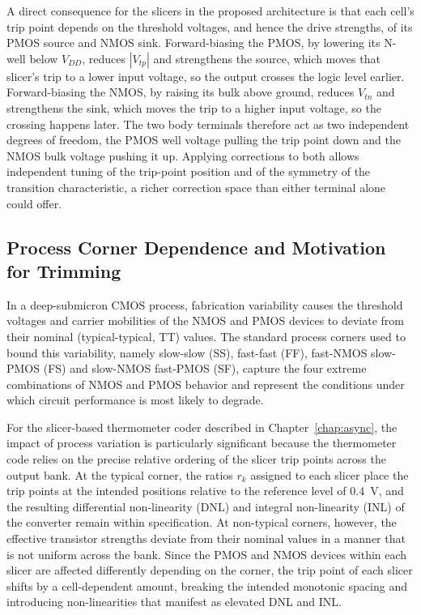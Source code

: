 A direct consequence for the slicers in the proposed architecture is that
each cell's trip point depends on the threshold voltages, and hence the drive
strengths, of its PMOS source and NMOS sink. Forward-biasing the PMOS, by
lowering its N-well below $V_{DD}$, reduces $|V_{tp}|$ and strengthens the
source, which moves that slicer's trip to a lower input voltage, so the output
crosses the logic level earlier. Forward-biasing the NMOS, by raising its bulk
above ground, reduces $V_{tn}$ and strengthens the sink, which moves the trip
to a higher input voltage, so the crossing happens later. The two body
terminals therefore act as two independent degrees of freedom, the PMOS well
voltage pulling the trip point down and the NMOS bulk voltage pushing it up.
Applying corrections to both allows independent tuning of the trip-point
position and of the symmetry of the transition characteristic, a richer
correction space than either terminal alone could offer.

\subsection{Process Corner Dependence and Motivation for Trimming}
\label{sec:corner_dependence}

In a deep-submicron CMOS process, fabrication variability causes the threshold
voltages and carrier mobilities of the NMOS and PMOS devices to deviate from
their nominal (typical-typical, TT) values. The standard process corners used
to bound this variability, namely slow-slow (SS), fast-fast (FF), fast-NMOS
slow-PMOS (FS) and slow-NMOS fast-PMOS (SF), capture the four extreme
combinations of NMOS and PMOS behavior and represent the conditions under
which circuit performance is most likely to degrade.

For the slicer-based thermometer coder described in Chapter~\ref{chap:async},
the impact of process variation is particularly significant because the
thermometer code relies on the precise relative ordering of the slicer trip
points across the output bank. At the typical corner, the ratios $r_k$
assigned to each slicer place the trip points at the intended positions
relative to the reference level of $0.4$~V, and the resulting differential
non-linearity (DNL) and integral non-linearity (INL) of the converter remain
within specification. At non-typical corners, however, the effective
transistor strengths deviate from their nominal values in a manner that is not
uniform across the bank. Since the PMOS and NMOS devices within each slicer
are affected differently depending on the corner, the trip point of each
slicer shifts by a cell-dependent amount, breaking the intended monotonic
spacing and introducing non-linearities that manifest as elevated DNL and INL.

